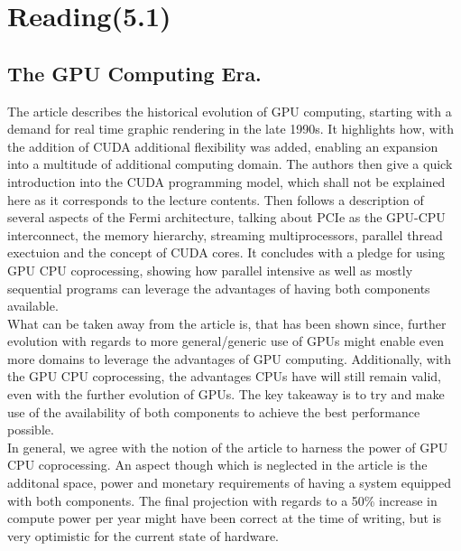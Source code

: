 
\newpage
\section{Reading(5.1)} 
\subsection{The GPU Computing Era.}
The article describes the historical evolution of GPU computing, starting with a demand for real time graphic rendering in the late 1990s. It highlights how, with the addition of CUDA additional flexibility was added, enabling an expansion into a multitude of additional computing domain. The authors then give a quick introduction into the CUDA programming model, which shall not be explained here as it corresponds to the lecture contents. Then follows a description of several aspects of the Fermi architecture, talking about PCIe as the GPU-CPU interconnect, the memory hierarchy, streaming multiprocessors, parallel thread exectuion and the concept of CUDA cores. It concludes with a pledge for using GPU CPU coprocessing, showing how parallel intensive as well as mostly sequential programs can leverage the advantages of having both components available.\\
\newline
What can be taken away from the article is, that has been shown since, further evolution with regards to more general/generic use of GPUs might enable even more domains to leverage the advantages of GPU computing. Additionally, with the GPU CPU coprocessing, the advantages CPUs have will still remain valid, even with the further evolution of GPUs. The key takeaway is to try and make use of the availability of both components to achieve the best performance possible.\\
\newline
In general, we agree with the notion of the article to harness the power of GPU CPU coprocessing. An aspect though which is neglected in the article is the additonal space, power and monetary requirements of having a system equipped with both components. The final projection with regards to a 50\% increase in compute power per year might have been correct at the time of writing, but is very optimistic for the current state of hardware.